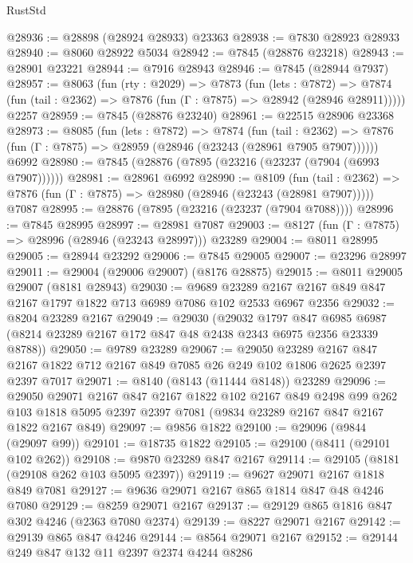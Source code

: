 \begin{lexlean}{RustStd}
\begin{coremodule}
@28936 := @28898 (@28924 @28933) @23363
@28938 := @7830 @28923 @28933
@28940 := @8060 @28922 @5034
@28942 := @7845 (@28876 @23218)
@28943 := @28901 @23221
@28944 := @7916 @28943
@28946 := @7845 (@28944 @7937)
@28957 := @8063
    (fun (rty : @2029) =>
    @7873
      (fun (lets : @7872) =>
      @7874 (fun (tail : @2362) => @7876 (fun (Γ : @7875) => @28942 (@28946 @28911)))))
    @2257
@28959 := @7845 (@28876 @23240)
@28961 := @22515 @28906 @23368
@28973 := @8085
    (fun (lets : @7872) =>
    @7874
      (fun (tail : @2362) =>
      @7876 (fun (Γ : @7875) => @28959 (@28946 (@23243 (@28961 @7905 @7907))))))
    @6992
@28980 := @7845 (@28876 (@7895 (@23216 (@23237 (@7904 (@6993 @7907))))))
@28981 := @28961 @6992
@28990 := @8109
    (fun (tail : @2362) => @7876 (fun (Γ : @7875) => @28980 (@28946 (@23243 (@28981 @7907)))))
    @7087
@28995 := @28876 (@7895 (@23216 (@23237 (@7904 @7088))))
@28996 := @7845 @28995
@28997 := @28981 @7087
@29003 := @8127 (fun (Γ : @7875) => @28996 (@28946 (@23243 @28997))) @23289
@29004 := @8011 @28995
@29005 := @28944 @23292
@29006 := @7845 @29005
@29007 := @23296 @28997
@29011 := @29004 (@29006 @29007) (@8176 @28875)
@29015 := @8011 @29005 @29007 (@8181 @28943)
@29030 := @9689
    @23289
    @2167
    @2167
    @849
    @847
    @2167
    @1797
    @1822
    @713
    @6989
    @7086
    @102
    @2533
    @6967
    @2356
@29032 := @8204 @23289 @2167
@29049 := @29030
    (@29032
      @1797
      @847
      @6985
      @6987
      (@8214 @23289 @2167 @172 @847 @48 @2438 @2343 @6975 @2356 @23339 @8788))
@29050 := @9789 @23289
@29067 := @29050
    @23289
    @2167
    @847
    @2167
    @1822
    @712
    @2167
    @849
    @7085
    @26
    @249
    @102
    @1806
    @2625
    @2397
    @2397
    @7017
@29071 := @8140 (@8143 (@11444 @8148)) @23289
@29096 := @29050
    @29071
    @2167
    @847
    @2167
    @1822
    @102
    @2167
    @849
    @2498
    @99
    @262
    @103
    @1818
    @5095
    @2397
    @2397
    @7081
    (@9834 @23289 @2167 @847 @2167 @1822 @2167 @849)
@29097 := @9856 @1822
@29100 := @29096 (@9844 (@29097 @99))
@29101 := @18735 @1822
@29105 := @29100 (@8411 (@29101 @102 @262))
@29108 := @9870 @23289 @847 @2167
@29114 := @29105 (@8181 (@29108 @262 @103 @5095 @2397))
@29119 := @9627 @29071 @2167 @1818 @849 @7081
@29127 := @9636 @29071 @2167 @865 @1814 @847 @48 @4246 @7080
@29129 := @8259 @29071 @2167
@29137 := @29129 @865 @1816 @847 @302 @4246 (@2363 @7080 @2374)
@29139 := @8227 @29071 @2167
@29142 := @29139 @865 @847 @4246
@29144 := @8564 @29071 @2167
@29152 := @29144 @249 @847 @132 @11 @2397 @2374 @4244 @8286

\end{coremodule}
\end{lexlean}
